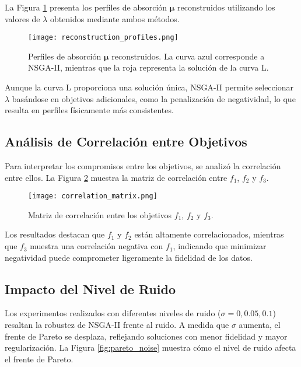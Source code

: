 La Figura \ref{fig:reconstruction_profiles} presenta los perfiles de absorción \( \mathbf{\mu} \) reconstruidos utilizando los valores de \( \lambda \) obtenidos mediante ambos métodos.

\begin{figure}[h]
    \centering
    \texttt{[image: reconstruction\_profiles.png]}
    \caption{Perfiles de absorción \( \mathbf{\mu} \) reconstruidos. La curva azul corresponde a NSGA-II, mientras que la roja representa la solución de la curva L.}
    \label{fig:reconstruction_profiles}
\end{figure}

Aunque la curva L proporciona una solución única, NSGA-II permite seleccionar \( \lambda \) basándose en objetivos adicionales, como la penalización de negatividad, lo que resulta en perfiles físicamente más consistentes.

\subsection{Análisis de Correlación entre Objetivos} \label{sec:results:correlation}

Para interpretar los compromisos entre los objetivos, se analizó la correlación entre ellos. La Figura \ref{fig:correlation_matrix} muestra la matriz de correlación entre \( f_1 \), \( f_2 \) y \( f_3 \).

\begin{figure}[h]
    \centering
    \texttt{[image: correlation\_matrix.png]}
    \caption{Matriz de correlación entre los objetivos \( f_1 \), \( f_2 \) y \( f_3 \).}
    \label{fig:correlation_matrix}
\end{figure}

Los resultados destacan que \( f_1 \) y \( f_2 \) están altamente correlacionados, mientras que \( f_3 \) muestra una correlación negativa con \( f_1 \), indicando que minimizar negatividad puede comprometer ligeramente la fidelidad de los datos.

\subsection{Impacto del Nivel de Ruido} \label{sec:results:noise}

Los experimentos realizados con diferentes niveles de ruido (\( \sigma = 0, 0.05, 0.1 \)) resaltan la robustez de NSGA-II frente al ruido. A medida que \( \sigma \) aumenta, el frente de Pareto se desplaza, reflejando soluciones con menor fidelidad y mayor regularización. La Figura \ref{fig:pareto_noise} muestra cómo el nivel de ruido afecta el frente de Pareto.

